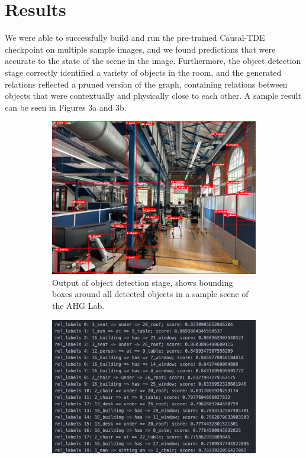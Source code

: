 \documentclass[letterpaper, 10 pt, conference]{ieeeconf}  %
\begin{document}
\section{Results}
    We were able to successfully build and run the pre-trained Causal-TDE checkpoint on multiple sample images, and we found predictions that were accurate to the state of the scene in the image. Furthermore, the object detection stage correctly identified a variety of objects in the room, and the generated relations reflected a pruned version of the graph, containing relations between objects that were contextually and physically close to each other. A sample result can be seen in Figures 3a and 3b.

    \begin{figure}
        \centering
        \begin{subfigure}{0.48\textwidth}
            \centering
            \includegraphics[width=1\textwidth]{images/output.png}
            \caption{Output of object detection stage, shows bounding boxes around all detected objects in a sample scene of the AHG Lab.}
            \label{fig:outputs}
        \end{subfigure}
        \begin{subfigure}{0.48\textwidth}
            \centering
            \includegraphics[width=1\textwidth]{images/graph.png}

\end{subfigure}
\end{figure}
\end{document}
